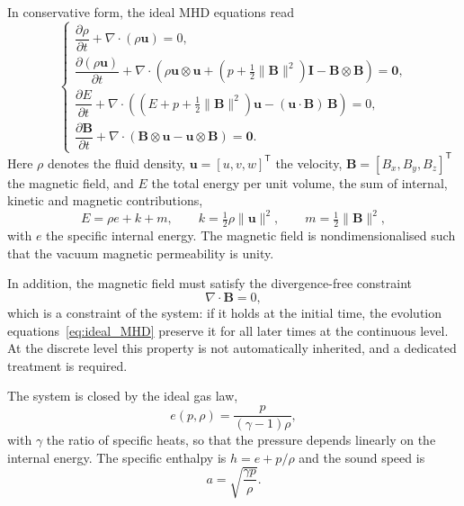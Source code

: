 \documentclass[a4paper,fleqn]{cas-sc}
\theoremstyle{remark}
\newcommand{\Bb}{\mathbf{B}}
\newcommand{\half}{\tfrac{1}{2}}
\begin{document}
In conservative form, the ideal MHD equations read
\begin{equation}
\label{eq:ideal_MHD}
\begin{cases}
\dfrac{\partial \rho}{\partial t}+ \nabla \cdot (\rho \mathbf{u}) = 0, \\[1.5ex]
\dfrac{\partial (\rho \mathbf{u})}{\partial t}+ \nabla \cdot \left( \rho \mathbf{u} \otimes \mathbf{u}
+ \left( p + \tfrac{1}{2}\|\Bb\|^2 \right)\mathbf{I}- \Bb \otimes \Bb \right) = \mathbf{0}, \\[1.5ex]
\dfrac{\partial E}{\partial t}+ \nabla \cdot \left( \left( E + p + \tfrac{1}{2}\|\Bb\|^2 \right)\mathbf{u}
- (\mathbf{u}\cdot\Bb)\,\Bb \right) = 0, \\[1.5ex]
\dfrac{\partial \Bb}{\partial t}+ \nabla \cdot \left( \Bb \otimes \mathbf{u}- \mathbf{u} \otimes \Bb \right) = \mathbf{0}.
\end{cases}
\end{equation}
Here $\rho$ denotes the fluid density, $\mathbf{u}=[u,v,w]^{\mathsf T}$ the velocity,
$\Bb=[B_x,B_y,B_z]^{\mathsf T}$ the magnetic field, and $E$ the total energy
per unit volume, the sum of internal, kinetic and magnetic contributions,
\begin{equation}
\label{eq:total_energy}
E=\rho e+k+m,\qquad
k=\half\rho\|\mathbf{u}\|^2,\qquad
m=\half\|\Bb\|^2,
\end{equation}
with $e$ the specific internal energy. The magnetic field is nondimensionalised
such that the vacuum magnetic permeability is unity.

In addition, the magnetic field must satisfy the divergence-free constraint
\begin{equation}
\label{eq:divB}
\nabla\cdot\Bb=0,
\end{equation}
which is a constraint of the system: if it holds at the initial time, the
evolution equations~\eqref{eq:ideal_MHD} preserve it for all later times at the
continuous level. At the discrete level this property is not automatically
inherited, and a dedicated treatment is required.

The system is closed by the ideal gas law,
\begin{equation}
\label{eq:eos}
e(p,\rho)=\frac{p}{(\gamma-1)\rho},
\end{equation}
with $\gamma$ the ratio of specific heats, so that the pressure depends linearly
on the internal energy. The specific enthalpy is $h=e+p/\rho$ and the sound speed
is
\begin{equation}
\label{eq:soundspeed}
a=\sqrt{\frac{\gamma p}{\rho}} .
\end{equation}
\end{document}
